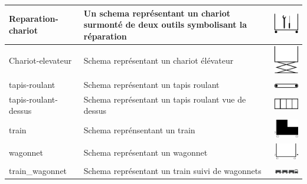 \begin{longtable}{|m{3cm}|m{9cm}|m{2.5cm}|}
\hline
Reparation-chariot  & Un schema représentant un chariot surmonté de deux outils symbolisant la réparation  & \includegraphics[width=2.5cm]{img/Reparation-chariot.pdf} \\
\hline
Chariot-elevateur  & Schema représentant un chariot élévateur & \includegraphics[width=2.5cm]{img/Chariot-elevateur.pdf} \\
\hline
tapis-roulant  & Schema représentant un tapis roulant & \includegraphics[width=2.5cm]{img/tapis-roulant.pdf} \\
\hline
tapis-roulant-dessus  & Schema représentant un tapis roulant vue de dessus & \includegraphics[width=2.5cm]{img/tapis-roulant-dessus.pdf} \\
\hline
train  & Schema reprénsentant un train & \includegraphics[width=2.5cm]{img/train.pdf} \\
\hline
wagonnet  & Schema représentant un wagonnet & \includegraphics[width=2.5cm]{img/wagonnet.pdf} \\
\hline
train\_wagonnet & Schema représentant un train suivi de wagonnets & \includegraphics[width=2.5cm]{img/train_wagonnets.png} \\

\end{longtable}
